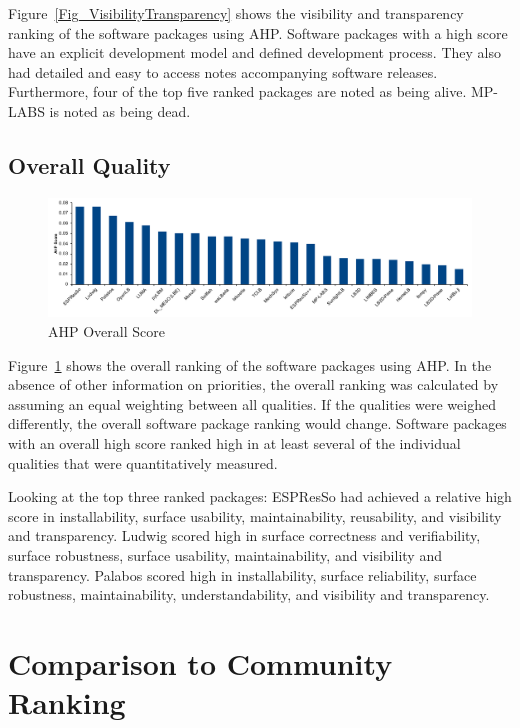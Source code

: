 \documentclass[final, 3p, times, authoryear]{elsarticle}
\begin{document}
Figure~\ref{Fig_VisibilityTransparency} shows the visibility and transparency
ranking of the software packages using AHP. Software packages with a high score
have an explicit development model and defined development process. They also
had detailed and easy to access notes accompanying software releases.
Furthermore, four of the top five ranked packages are noted as being alive.
MP-LABS is noted as being dead.

\subsection{Overall Quality}

\begin{figure}[h!]
	\centering
		\includegraphics[width=1.0\textwidth]{./figures/finalscore_chart.pdf}
		\caption{AHP Overall Score}
		\label{Fig_OverallScore}
\end{figure}

Figure~\ref{Fig_OverallScore} shows the overall ranking of the software packages
using AHP. In the absence of other information on priorities, the overall
ranking was calculated by assuming an equal weighting between all qualities. If the
qualities were weighed differently, the overall software package ranking would
change. Software packages with an overall high score ranked high in at least
several of the individual qualities that were quantitatively measured. 

Looking at the top three ranked packages: ESPResSo had achieved a relative high
score in installability, surface usability, maintainability, reusability, and
visibility and transparency. Ludwig scored high in surface correctness and
verifiability, surface robustness, surface usability, maintainability, and
visibility and transparency. Palabos scored high in installability, surface
reliability, surface robustness, maintainability, understandability, and
visibility and transparency. 

\section{Comparison to Community Ranking} \label{repmetrics}
\end{document}
